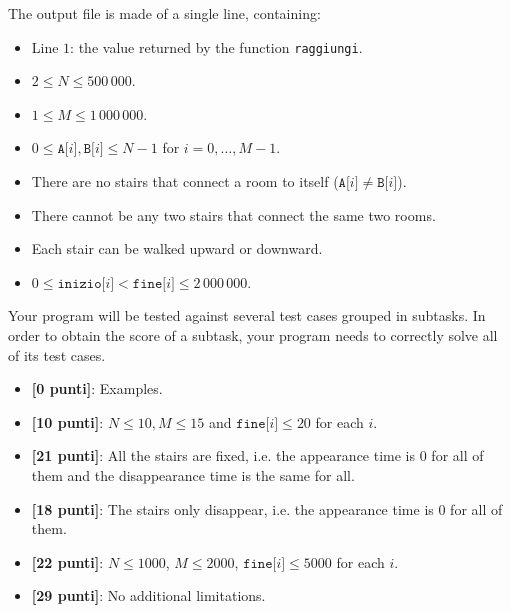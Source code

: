 The output file is made of a single line, containing:
\begin{itemize}[nolistsep,itemsep=2mm]
\item Line $1$: the value returned by the function \texttt{raggiungi}.
\end{itemize}



\Constraints

\begin{itemize}[nolistsep, itemsep=2mm]
	\item $2 \le N \le 500\,000$.
	\item $1 \le M \le 1\,000\,000$.
	\item $0 \le \texttt{A[}i\texttt{]}, \texttt{B[}i\texttt{]} \le N-1$ for $i=0,\ldots, M-1$.
	\item There are no stairs that connect a room to itself ($\texttt{A[}i\texttt{]} \neq \texttt{B[}i\texttt{]}$).
	\item There cannot be any two stairs that connect the same two rooms.
	\item Each stair can be walked upward or downward.
	\item $0 \le \texttt{inizio[}i\texttt{]} < \texttt{fine[}i\texttt{]} \le 2\,000\,000$.
\end{itemize}



\Scoring 

Your program will be tested against several test cases grouped in subtasks.
In order to obtain the score of a subtask, your program needs to correctly solve all of its test cases.

\begin{itemize}[nolistsep,itemsep=2mm]
  \item \textbf{ [\phantom{1}0 punti]}: Examples.
  \item \textbf{ [10 punti]}: $N \le 10, M \le 15$ and $\texttt{fine[}i\texttt{]} \le 20$ for each $i$.
  \item \textbf{ [21 punti]}: All the stairs are fixed, i.e. the appearance time is $0$ for all of them and the disappearance time is the same for all.
  \item \textbf{ [18 punti]}: The stairs only disappear, i.e. the appearance time is $0$ for all of them.
  \item \textbf{ [22 punti]}: $N \leq 1000$, $M \le 2000$, $\texttt{fine[}i\texttt{]} \le 5000$ for each $i$. 
  \item \textbf{ [29 punti]}: No additional limitations.
\end{itemize}

